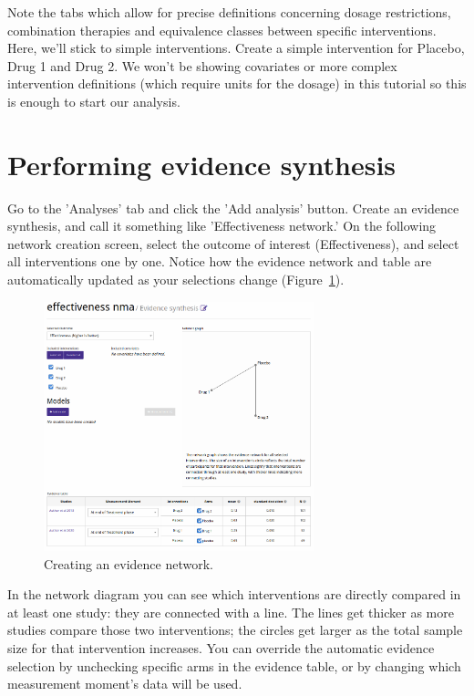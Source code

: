 \documentclass[12pt]{article}
\begin{document}
Note the tabs which allow for precise definitions concerning dosage restrictions, combination therapies and equivalence classes between specific interventions.
Here, we'll stick to simple interventions.
Create a simple intervention for Placebo, Drug 1 and Drug 2.
We won't be showing covariates or more complex intervention definitions (which require units for the dosage) in this tutorial so this is enough to start our analysis.

\section{Performing evidence synthesis}

Go to the 'Analyses' tab and click the 'Add analysis' button.
Create an evidence synthesis, and call it something like 'Effectiveness network.'
On the following network creation screen, select the outcome of interest (Effectiveness), and select all interventions one by one.
Notice how the evidence network and table are automatically updated as your selections change  (Figure~\ref{fig:createNetwork}).

\begin{figure}[!ht]
  \centering
  \includegraphics[width=0.7\textwidth]{img/createNetwork.png}
  \caption{Creating an evidence network.}
\label{fig:createNetwork}
\end{figure}

In the network diagram you can see which interventions are directly compared in at least one study: they are connected with a line.
The lines get thicker as more studies compare those two interventions; the circles get larger as the total sample size for that intervention increases.
You can override the automatic evidence selection by unchecking specific arms in the evidence table, or by changing which measurement moment's data will be used.
\end{document}
